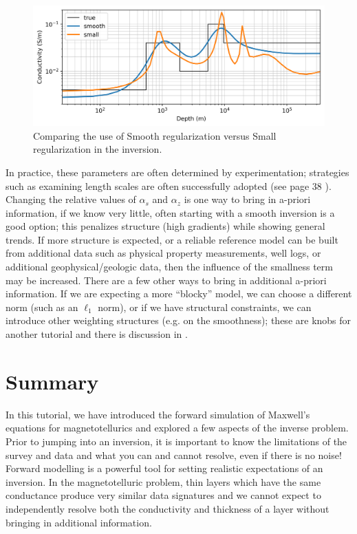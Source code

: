 \documentclass[11pt,oneside]{article}
\begin{document}
\begin{figure}[htb!]
    \centering
    \includegraphics[width=\textwidth]{images/alphas.png}
\caption{Comparing the use of Smooth regularization versus Small regularization in the inversion.}
\label{fig:alphas}
\end{figure}
In practice, these parameters are often determined by experimentation; strategies such as examining length scales are often successfully adopted (see page 38 \cite{OldenburgTutorial}). Changing the relative values of $\alpha_s$ and $\alpha_z$ is one way to bring in a-priori information, if we know very little, often starting with a smooth inversion is a good option; this penalizes structure (high gradients) while showing general trends. If more structure is expected, or a reliable reference model can be built from additional data such as physical property measurements, well logs, or additional geophysical/geologic data, then the influence of the smallness term may be increased. There are a few other ways to bring in additional a-priori information. If we are expecting a more ``blocky'' model, we can choose a different norm (such as an $\ell_1$ norm), or if we have structural constraints, we can introduce other weighting structures (e.g. on the smoothness); these are knobs for another tutorial and there is discussion in \cite{OldenburgTutorial}.

\section{Summary}
In this tutorial, we have introduced the forward simulation of Maxwell’s equations for magnetotellurics and explored a few aspects of the inverse problem. Prior to jumping into an inversion, it is important to know the limitations of the survey and data and what you can and cannot resolve, even if there is no noise! Forward modelling is a powerful tool for setting realistic expectations of an inversion. In the magnetotelluric problem, thin layers which have the same conductance produce very similar data signatures and we cannot expect to independently resolve both the conductivity and thickness of a layer without bringing in additional information.
\end{document}
